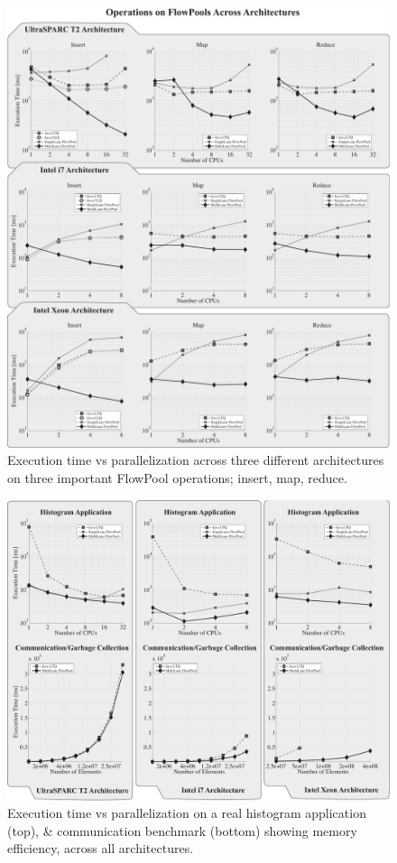 \documentclass[runningheads,a4paper,fleqn]{llncs}
\begin{document}
\begin{figure}
\centering
\includegraphics[width=\textwidth]{../../benchmarks/graphs/scaling-operations}
\caption{Execution time vs parallelization across three different
  architectures on three important FlowPool operations; insert, map,
  reduce.}
\label{fig:eval-cpu-scaling}
\end{figure}

\begin{figure}
\centering
\includegraphics[width=\textwidth]{../../benchmarks/graphs/hist-comm}
\caption{Execution time vs parallelization on a real histogram application
(top), \& communication benchmark (bottom) showing memory efficiency, 
across all architectures.}
\label{fig:eval-hist-comm}
\end{figure}
\end{document}
